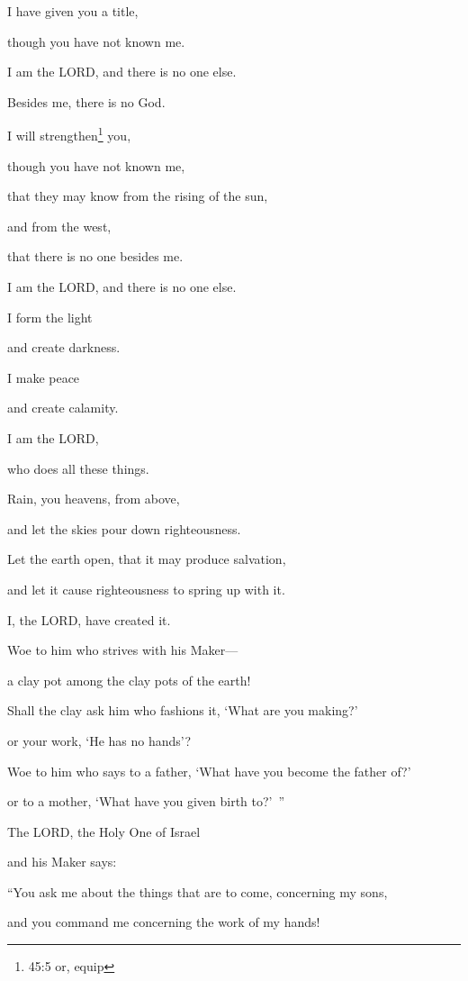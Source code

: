 I have given you a title,

though you have not known me.

\myverse{}I am the LORD, and there is no one else.

Besides me, there is no God.

I will strengthen\footnote{45:5 or, equip} you,

though you have not known me,

\myverse{}that they may know from the rising of the sun,

and from the west,

that there is no one besides me.

I am the LORD, and there is no one else.

\myverse{}I form the light

and create darkness.

I make peace

and create calamity.

I am the LORD,

who does all these things.


\vspace{\baselineskip} \myverse{}Rain, you heavens, from above,

and let the skies pour down righteousness.

Let the earth open, that it may produce salvation,

and let it cause righteousness to spring up with it.

I, the LORD, have created it.


\vspace{\baselineskip} \myverse{}Woe to him who strives with his Maker—

a clay pot among the clay pots of the earth!

Shall the clay ask him who fashions it, ‘What are you making?’

or your work, ‘He has no hands’?

\myverse{}Woe to him who says to a father, ‘What have you become the
father of?’

or to a mother, ‘What have you given birth to?’ ”


\vspace{\baselineskip} \myverse{}The LORD, the Holy One of Israel

and his Maker says:

“You ask me about the things that are to come, concerning my sons,

and you command me concerning the work of my hands!

